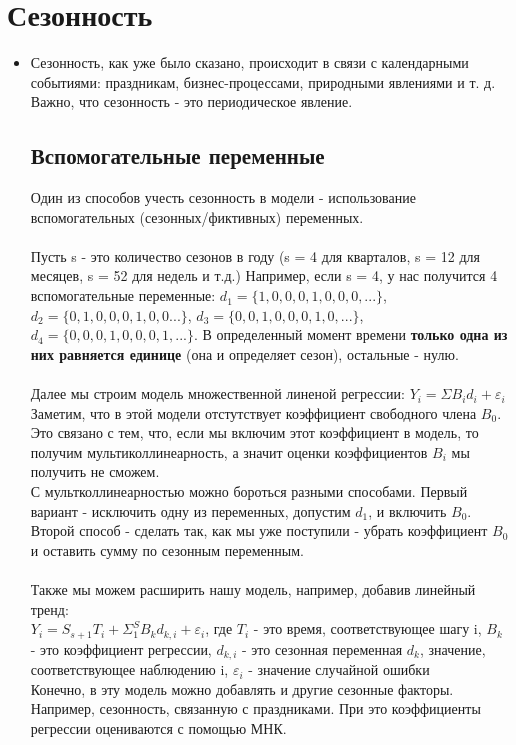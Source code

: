 \documentclass{article}
\begin{document}
\section{Сезонность}
\begin{itemize}
    \item Сезонность, как уже было сказано, происходит в связи с календарными событиями: праздникам, бизнес-процессами, природными явлениями и т. д. Важно, что сезонность - это периодическое явление.
    \subsection{Вспомогательные переменные}
    Один из способов учесть сезонность в модели - использование вспомогательных (сезонных/фиктивных) переменных.
    \\
    \\ Пусть s - это количество сезонов в году (s = 4 для кварталов, s = 12 для месяцев, s = 52 для недель и т.д.) Например, если s = 4, у нас получится 4 вспомогательные переменные: $d_1 = \{ 1, 0, 0, 0, 1, 0, 0, 0, ...\}$, $d_2 = \{ 0, 1, 0, 0, 0, 1, 0, 0 ...\}$, $d_3 = \{ 0, 0, 1, 0, 0, 0, 1, 0, ...\}$, $d_4 = \{ 0, 0, 0, 1, 0, 0, 0, 1, ...\}$. В определенный момент времени \textbf{только одна из них равняется единице} (она и определяет сезон), остальные - нулю. 
    \\
    \\ Далее мы строим модель множественной линеной регрессии: $Y_i = \Sigma B_id_i + \varepsilon_i$
    \\ Заметим, что в этой модели отстутствует коэффициент свободного члена $B_0$. Это связано с тем, что, если мы включим этот коэффициент в модель, то получим мультиколлинеарность, а значит оценки коэффициентов $B_i$ мы получить не сможем.
    \\ С мультколлинеарностью можно бороться разными способами. Первый вариант - исключить одну из переменных, допустим $d_1$, и включить $B_0$. Второй способ - сделать так, как мы уже поступили - убрать коэффициент $B_0$ и оставить сумму по сезонным переменным.
    \\
    \\ Также мы можем расширить нашу модель, например, добавив линейный тренд: 
    \\ $Y_i = S_{s+1}T_i + \Sigma_1^S B_kd_{k,i} + \varepsilon_i$, где $T_i$ - это время, соответствующее шагу i, $B_k$ - это коэффициент регрессии, $d_{k, i}$ - это сезонная переменная $d_k$, значение, соответствующее наблюдению i, $\varepsilon_i$ - значение случайной ошибки
    \\ Конечно, в эту модель можно добавлять и другие сезонные факторы. Например, сезонность, связанную с праздниками. При это коэффициенты регрессии оцениваются с помощью МНК.

\end{itemize}
\end{document}

